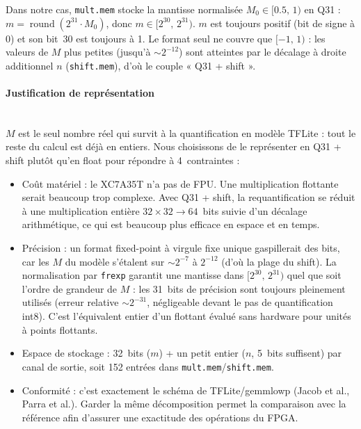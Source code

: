 \documentclass[11pt,a4paper]{article}
\begin{document}
Dans notre cas, \texttt{mult.mem} stocke la mantisse normalisée
$M_0 \in [0.5,\, 1)$ en Q31 : $m = \operatorname{round}(2^{31} \cdot M_0)$,
donc $m \in [2^{30},\, 2^{31})$. $m$ est toujours positif (bit de signe à 0)
et son bit~30 est toujours à 1. Le format seul ne couvre que $[-1,\, 1)$ :
les valeurs de $M$ plus petites (jusqu'à $\sim 2^{-12}$) sont atteintes par
le décalage à droite additionnel $n$ (\texttt{shift.mem}), d'où le couple
« Q31 + shift ».

\paragraph{Justification de représentation}\mbox{}\\

$M$ est le seul nombre réel qui survit à la quantification en modèle TFLite :
tout le reste du calcul est déjà en entiers. Nous choisissons de le
représenter en Q31 + shift plutôt qu'en float pour répondre à
4~contraintes :
\begin{itemize}
  \item Coût matériel : le XC7A35T n'a pas de FPU. Une multiplication
    flottante serait beaucoup trop complexe. Avec Q31 + shift, la
    requantification se réduit à une multiplication entière
    $32 \times 32 \to 64$~bits suivie d'un décalage arithmétique, ce qui est
    beaucoup plus efficace en espace et en temps.
  \item Précision : un format fixed-point à virgule fixe unique gaspillerait
    des bits, car les $M$ du modèle s'étalent sur $\sim 2^{-7}$ à $2^{-12}$
    (d'où la plage du shift). La normalisation par \texttt{frexp} garantit
    une mantisse dans $[2^{30},\, 2^{31})$ quel que soit l'ordre de grandeur
    de $M$ : les 31~bits de précision sont toujours pleinement utilisés
    (erreur relative $\sim 2^{-31}$, négligeable devant le pas de
    quantification int8). C'est l'équivalent entier d'un flottant évalué sans
    hardware pour unités à points flottants.
  \item Espace de stockage : 32~bits ($m$) + un petit entier ($n$, 5~bits
    suffisent) par canal de sortie, soit 152 entrées dans
    \texttt{mult.mem}/\texttt{shift.mem}.
  \item Conformité : c'est exactement le schéma de TFLite/gemmlowp (Jacob et
    al., Parra et al.). Garder la même décomposition permet la comparaison
    avec la référence afin d'assurer une exactitude des opérations du FPGA.
\end{itemize}
\end{document}
